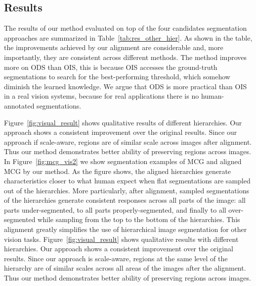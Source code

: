\subsection{Results}
The results of our method evaluated on top of the four candidates
segmentation approaches are summarized in
Table~\ref{tab:res_other_hier}. As shown in the table, the
improvements achieved by our alignment are considerable and, more
importantly, they are consistent across different methods.  The method
improves more on ODS than OIS, this is because OIS accesses the
ground-truth segmentations to search for the best-performing
threshold, which somehow diminish the learned knowledge.
We argue that ODS is more practical than OIS in a real vision systems,
because for real applications there is no human-annotated segmentations.

Figure~\ref{fig:visual_result} shows qualitative results of different hierarchies. Our approach shows a consistent improvement over the original results. Since our approach if scale-aware, regions are of similar scale across images after alignment. Thus our method demonstrates better ability of preserving regions across images. In Figure~\ref{fig:mcg_vis2} we show segmentation examples of MCG and
aligned MCG by our method. As the figure shows, the aligned
hierarchies generate characteristics closer to what human expect when
flat segmentations are sampled out of the hierarchies. More
particularly, after alignment, sampled segmentations of the
hierarchies generate consistent responses across all parts of the
image: all parts under-segmented, to all parts properly-segmented, and
finally to all over-segmented while sampling from the top to the
bottom of the hierarchies. This alignment greatly simplifies the use
of hierarchical image segmentation for other vision tasks.
Figure~\ref{fig:visual_result} shows qualitative results with
different hierarchies. Our approach shows a consistent improvement
over the original results. Since our approach is scale-aware, regions
at the same level of the hierarchy are of similar scales across all
areas of the images after the alignment. Thus our method demonstrates
better ability of preserving regions across images.


